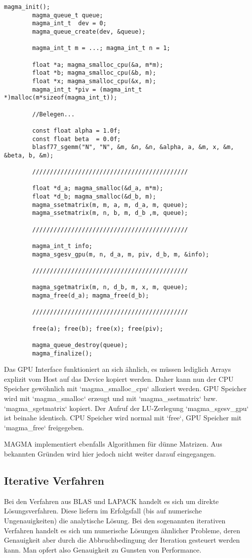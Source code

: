 		\begin{lstlisting}[caption=MAGMA: GPU-Interface]
		magma_init();
		magma_queue_t queue;
		magma_int_t  dev = 0;
		magma_queue_create(dev, &queue);
  
		magma_int_t m = ...; magma_int_t n = 1;
                      
		float *a; magma_smalloc_cpu(&a, m*m);   
		float *b; magma_smalloc_cpu(&b, m);  
		float *x; magma_smalloc_cpu(&x, m);   
		magma_int_t *piv = (magma_int_t *)malloc(m*sizeof(magma_int_t));
		
		//Belegen...

		const float alpha = 1.0f;
		const float beta  = 0.0f;
		blasf77_sgemm("N", "N", &m, &n, &n, &alpha, a, &m, x, &m, &beta, b, &m);

		////////////////////////////////////////////
		
		float *d_a; magma_smalloc(&d_a, m*m);
		float *d_b; magma_smalloc(&d_b, m);		
		magma_ssetmatrix(m, m, a, m, d_a, m, queue);
		magma_ssetmatrix(m, n, b, m, d_b ,m, queue);
		
		////////////////////////////////////////////

		magma_int_t info;
		magma_sgesv_gpu(m, n, d_a, m, piv, d_b, m, &info);
		
		////////////////////////////////////////////
		
		magma_sgetmatrix(m, n, d_b, m, x, m, queue);
		magma_free(d_a); magma_free(d_b);
		
		////////////////////////////////////////////
		
		free(a); free(b); free(x); free(piv);
		
		magma_queue_destroy(queue);
		magma_finalize();
		\end{lstlisting}
		
		Das GPU Interface funktioniert an sich ähnlich, es müssen lediglich Arrays explizit vom Host auf das Device kopiert werden. Daher kann nun der CPU Speicher gewöhnlich mit \li`magma_smalloc_cpu` $\!\!$alloziert werden. GPU Speicher wird mit \li`magma_smalloc` erzeugt und mit \li`magma_ssetmatrix` bzw. \li`magma_sgetmatrix` kopiert. Der Aufruf der LU-Zerlegung \li`magma_sgesv_gpu` ist beinahe identisch. CPU Speicher wird normal mit \li`free`, GPU Speicher mit \li`magma_free` freigegeben.	
		
		MAGMA implementiert ebenfalls Algorithmen für dünne Matrizen. Aus bekannten Gründen wird hier jedoch nicht weiter darauf eingegangen.
		
		\subsection{Iterative Verfahren}
		Bei den Verfahren aus BLAS und LAPACK handelt es sich um direkte Lösungsverfahren. Diese liefern im Erfolgsfall (bis auf numerische Ungenauigkeiten) die analytische Lösung. Bei den sogenannten iterativen Verfahren handelt es sich um numerische Lösungen ähnlicher Probleme, deren Genauigkeit aber durch die Abbruchbedingung der Iteration gesteuert werden kann. Man opfert also Genauigkeit zu Gunsten von Performance. 
		
